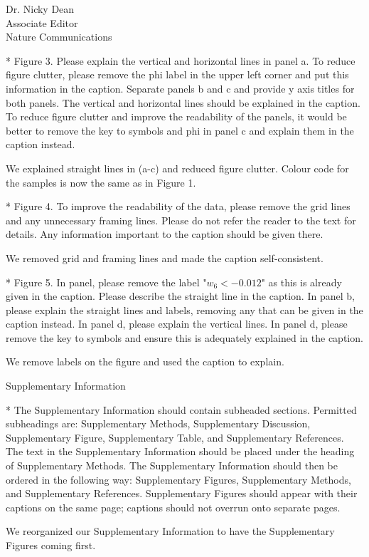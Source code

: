 \documentclass[a4paper, rebuttal, parskip=true, firsthead=false, fromemail=true, foldmarks=false]{scrlttr2}
\begin{document}
\begin{letter}{Dr. Nicky Dean\\
Associate Editor\\
Nature Communications}
\begin{quotationi}
* Figure 3. Please explain the vertical and horizontal lines in panel a. To reduce figure clutter, please remove the phi label in the upper left corner and put this information in the caption. Separate panels b and c and provide y axis titles for both panels. The vertical and horizontal lines should be explained in the caption. To reduce figure clutter and improve the readability of the panels, it would be better to remove the key to symbols and phi in panel c and explain them in the caption instead.
\end{quotationi}
We explained straight lines in (a-c) and reduced figure clutter. Colour code for the samples is now the same as in Figure 1.

\begin{quotationi}
* Figure 4. To improve the readability of the data, please remove the grid lines and any unnecessary framing lines. Please do not refer the reader to the text for details. Any information important to the caption should be given there.
\end{quotationi}
We removed grid and framing lines and made the caption self-consistent.


\begin{quotationi}
* Figure 5. In panel, please remove the label "$w_6<-0.012$" as this is already given in the caption. Please describe the straight line in the caption. In panel b, please explain the straight lines and labels, removing any that can be given in the caption instead. In panel d, please explain the vertical lines. In panel d, please remove the key to symbols and ensure this is adequately explained in the caption.
\end{quotationi}
We remove labels on the figure and used the caption to explain.

\textsf{Supplementary Information}
\begin{quotationi}

* The Supplementary Information should contain subheaded sections. Permitted subheadings are: Supplementary Methods, Supplementary Discussion, Supplementary Figure, Supplementary Table, and Supplementary References. The text in the Supplementary Information should be placed under the heading of Supplementary Methods. The Supplementary Information should then be ordered in the following way: Supplementary Figures, Supplementary Methods, and Supplementary References. Supplementary Figures should appear with their captions on the same page; captions should not overrun onto separate pages.
\end{quotationi}
We reorganized our Supplementary Information to have the Supplementary Figures coming first.


\end{letter}
\end{document}
